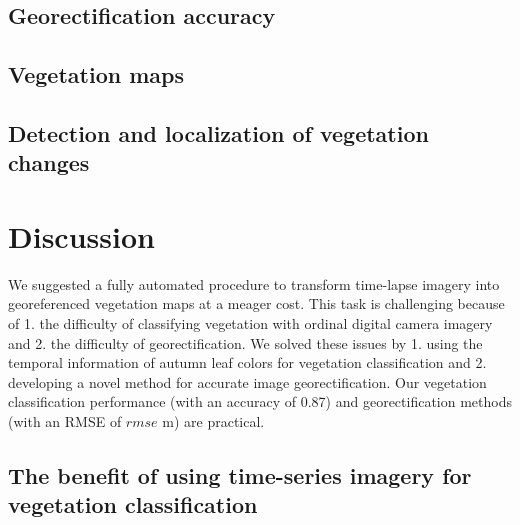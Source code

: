 \documentclass{article}
\begin{document}
\hypertarget{georectification-accuracy}{%
\subsection{Georectification accuracy}\label{georectification-accuracy}}

\hypertarget{vegetation-maps}{%
\subsection{Vegetation maps}\label{vegetation-maps}}

\hypertarget{detection-and-localization-of-vegetation-changes}{%
\subsection{Detection and localization of vegetation
changes}\label{detection-and-localization-of-vegetation-changes}}

\hypertarget{discussion}{%
\section{Discussion}\label{discussion}}

We suggested a fully automated procedure to transform time-lapse imagery
into georeferenced vegetation maps at a meager cost. This task is
challenging because of 1. the difficulty of classifying vegetation with
ordinal digital camera imagery and 2. the difficulty of
georectification. We solved these issues by 1. using the temporal
information of autumn leaf colors for vegetation classification and 2.
developing a novel method for accurate image georectification. Our
vegetation classification performance (with an accuracy of 0.87) and
georectification methods (with an RMSE of \(rmse\) m) are practical.

\hypertarget{the-benefit-of-using-time-series-imagery-for-vegetation-classification}{%
\subsection{The benefit of using time-series imagery for vegetation
classification}\label{the-benefit-of-using-time-series-imagery-for-vegetation-classification}}
\end{document}
